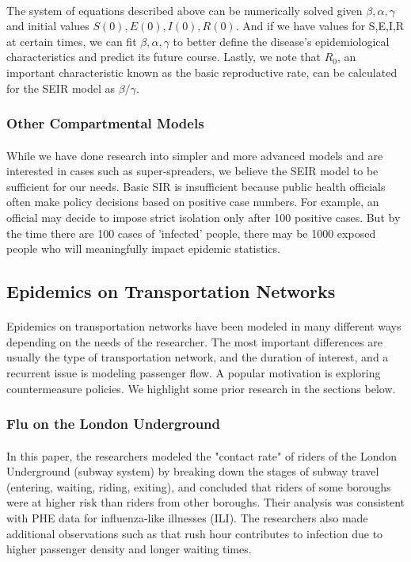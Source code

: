 \documentclass[12pt, a4, epsf] {article}
\theoremstyle{plain}
\theoremstyle{definition}
\begin{document}
\paragraph{}
The system of equations described above can be numerically solved given $\beta,\alpha,\gamma$ and initial values $S(0),E(0),I(0),R(0)$. And if we have values for S,E,I,R at certain times, we can fit $\beta,\alpha,\gamma$ to better define the disease's epidemiological characteristics and predict its future course. Lastly, we note that $R_0$, an important characteristic known as the basic reproductive rate, can be calculated for the SEIR model as $\beta/\gamma$.
\subsubsection{Other Compartmental Models}
\paragraph{}
While we have done research into simpler and more advanced models and are interested in cases such as super-spreaders, we believe the SEIR model to be sufficient for our needs. Basic SIR is insufficient because public health officials often make policy decisions based on positive case numbers. For example, an official may decide to impose strict isolation only after 100 positive cases. But by the time there are 100 cases of 'infected' people, there may be 1000 exposed people who will meaningfully impact epidemic statistics.
\subsection{Epidemics on Transportation Networks}
\paragraph{}
Epidemics on transportation networks have been modeled in many different ways depending on the needs of the researcher. The most important differences are usually the type of transportation network, and the duration of interest, and a recurrent issue is modeling passenger flow. A popular motivation is exploring countermeasure policies. We highlight some prior research in the sections below.
\subsubsection{Flu on the London Underground \cite{gosce_johansson_2018}}
\paragraph{}
In this paper, the researchers modeled the "contact rate" of riders of the London Underground (subway system) by breaking down the stages of subway travel (entering, waiting, riding, exiting), and concluded that riders of some boroughs were at higher risk than riders from other boroughs. Their analysis was consistent with PHE data for influenza-like illnesses (ILI). The researchers also made additional observations such as that rush hour contributes to infection due to higher passenger density and longer waiting times.
\end{document}
